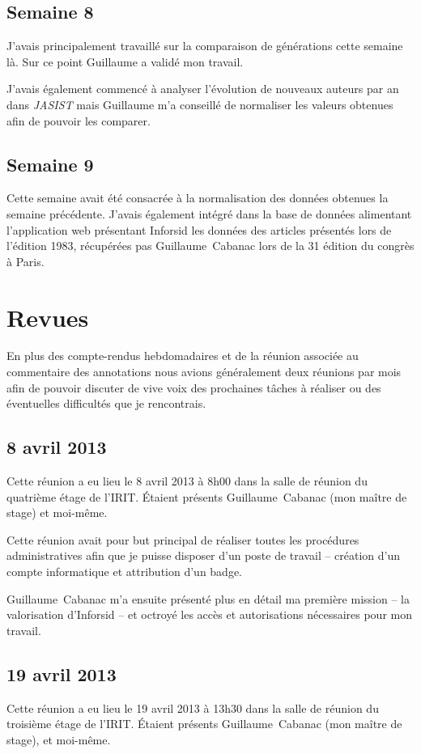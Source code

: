 	
	\subsection{Semaine 8}\label{ch:CRH8}
		J'avais principalement travaillé sur la comparaison de générations cette semaine là. Sur ce point Guillaume a validé mon travail.
		
		J'avais également commencé à analyser l'évolution de nouveaux auteurs par an dans \textit{JASIST} mais Guillaume m'a conseillé de normaliser les valeurs obtenues afin de pouvoir les comparer.
	
	
	\subsection{Semaine 9}
		Cette semaine avait été consacrée à la normalisation des données obtenues la semaine précédente. J'avais également intégré dans la base de données alimentant l'application web présentant Inforsid les données des articles présentés lors de l'édition 1983, récupérées pas Guillaume~Cabanac lors de la 31 édition du congrès à Paris.


\section{Revues}
	En plus des compte-rendus hebdomadaires et de la réunion associée au commentaire des annotations nous avions généralement deux réunions par mois afin de pouvoir discuter de vive voix des prochaines tâches à réaliser ou des éventuelles difficultés que je rencontrais.
	
	
	\subsection{8 avril 2013}
		Cette réunion a eu lieu le 8 avril 2013 à 8h00 dans la salle de réunion du quatrième étage de l'IRIT. Étaient présents Guillaume~Cabanac (mon maître de stage) et moi-même.
		
		Cette réunion avait pour but principal de réaliser toutes les procédures administratives afin que je puisse disposer d'un poste de travail -- création d'un compte informatique et attribution d'un badge.
		
		Guillaume~Cabanac m'a ensuite présenté plus en détail ma première mission -- la valorisation d'Inforsid -- et octroyé les accès et autorisations nécessaires pour mon travail.
	
	
	\subsection{19 avril 2013}
		Cette réunion a eu lieu le 19 avril 2013 à 13h30 dans la salle de réunion du troisième étage de l'IRIT. Étaient présents Guillaume~Cabanac (mon maître de stage), et moi-même.
		
